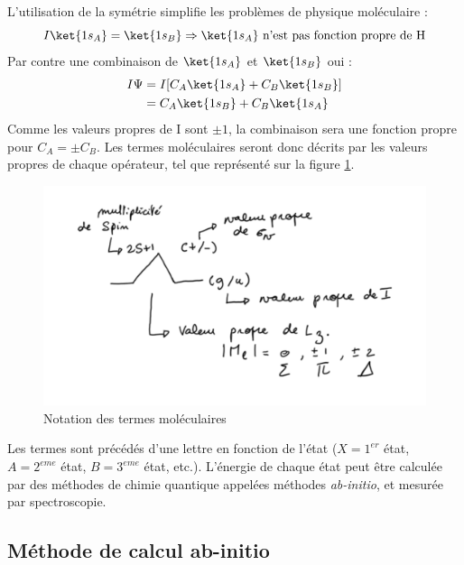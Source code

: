 L'utilisation de la symétrie simplifie les problèmes de physique moléculaire : 
\begin{equation*}
    I\ket{1s_A} = \ket{1s_B} \Rightarrow \ket{1s_A} \textrm{ n'est pas fonction propre de H}
\end{equation*}
Par contre une combinaison de $\ket{1s_A}$ et $\ket{1s_B}$ oui :
\begin{equation*}
\begin{split}
    I\Psi &= I[C_A\ket{1s_A} + C_B\ket{1s_B}]\\
    &= C_A\ket{1s_B} + C_B\ket{1s_A}
\end{split}
\end{equation*}
Comme les valeurs propres de I sont $\pm 1$, la combinaison sera une fonction propre pour $C_A = \pm C_B$.\newline
Les termes moléculaires seront donc décrits par les valeurs propres de chaque opérateur, tel que représenté sur la figure \ref{fig:notation}.\newline
\begin{figure}
    \centering
    \includegraphics[scale=0.6]{Images3/Notation_mol.PNG}
    \caption{Notation des termes moléculaires}
    \label{fig:notation}
\end{figure}
Les termes sont précédés d'une lettre en fonction de l'état ($X = 1^{er}$ état, $A = 2^{eme}$ état, $B = 3^{eme}$ état, etc.).\newline
L'énergie de chaque état peut être calculée par des méthodes de chimie quantique appelées méthodes \textit{ab-initio}, et mesurée par spectroscopie.

\subsection{Méthode de calcul ab-initio}

